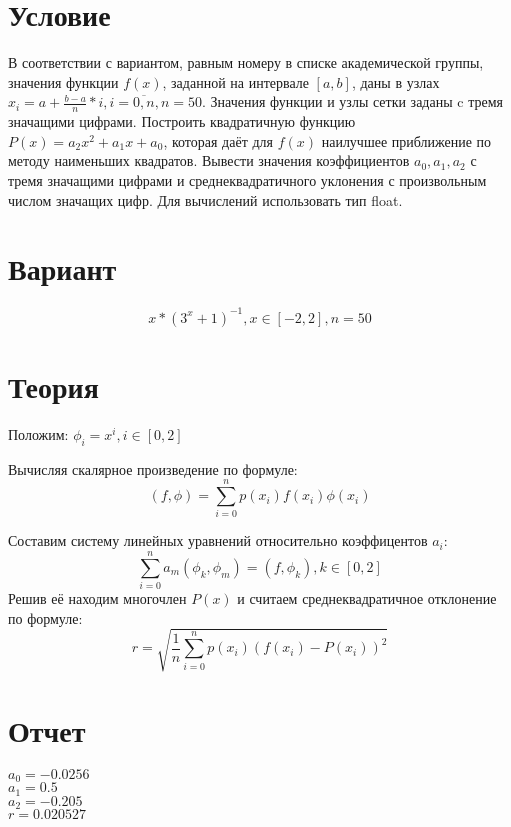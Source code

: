 \documentclass{article}
\begin{document}
\section{Условие}
В соответствии с вариантом, равным номеру в списке академической группы, значения функции $f(x)$, заданной на интервале $[a,b]$, даны в узлах $x_i = a + \frac{b-a}{n}*i, i = \overline{0,n}, n=50$. Значения функции и узлы сетки заданы c тремя значащими цифрами.
Построить квадратичную функцию $P(x) = a_2x^2+a_1x+a_0$, которая даёт для $f(x)$ наилучшее приближение по методу наименьших квадратов. Вывести значения коэффициентов $a_0,a_1,a_2$ с тремя значащими цифрами и среднеквадратичного уклонения с произвольным числом значащих цифр. Для вычислений использовать тип float.

\section{Вариант}
    \begin{equation}
    x*(3^x + 1)^{-1}, x\in[-2,2], n=50
\end{equation}

\section{Теория}
\begin{center}
Положим: $\phi_i = x^i, i \in [0,2]$
\end{center}

Вычисляя скалярное произведение по формуле:
\begin{equation}
    (f, \phi) = \sum\limits_{i=0}^n p(x_i)f(x_i)\phi(x_i)
\end{equation}

Составим систему линейных уравнений относительно коэффицентов $a_i$:
\begin{equation}
    \sum\limits_{i=0}^n a_m(\phi_k, \phi_m) = (f, \phi_k), k \in [0,2]
\end{equation}
Решив её находим многочлен $P(x)$ и считаем среднеквадратичное отклонение по формуле:
\begin{equation}
    r = \sqrt{\frac{1}{n} \sum\limits_{i=0}^n p(x_i)(f(x_i)-P(x_i))^2}
\end{equation}

\section{Отчет}
\begin{center}
    $ a_0 = -0.0256$\\
    $ a_1 = 0.5$\\
    $ a_2 = -0.205$\\
    $ r = 0.020527$
\end{center}
\end{document}
